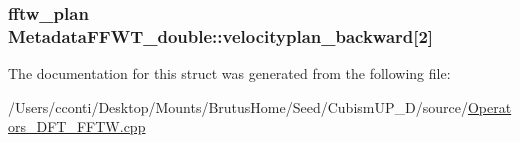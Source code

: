 \subsubsection[{velocityplan\+\_\+backward}]{\setlength{\rightskip}{0pt plus 5cm}fftw\+\_\+plan Metadata\+F\+F\+W\+T\+\_\+double\+::velocityplan\+\_\+backward\mbox{[}2\mbox{]}}\label{struct_metadata_f_f_w_t__double_ade6f127e609361c0c5a785a661c94fd5}


The documentation for this struct was generated from the following file\+:\begin{DoxyCompactItemize}
\item 
/\+Users/cconti/\+Desktop/\+Mounts/\+Brutus\+Home/\+Seed/\+Cubism\+U\+P\+\_\+D/source/\hyperlink{_operators___d_f_t___f_f_t_w_8cpp}{Operators\+\_\+\+D\+F\+T\+\_\+\+F\+F\+T\+W.\+cpp}\end{DoxyCompactItemize}
